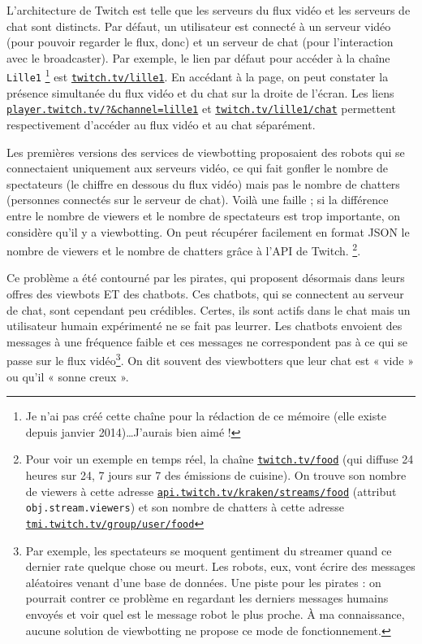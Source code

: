 \documentclass[a4paper]{article}
\begin{document}
L'architecture de Twitch est telle que les serveurs du flux vidéo et les serveurs de chat sont distincts. Par défaut, un utilisateur est connecté à un serveur vidéo (pour pouvoir regarder le flux, donc) et un serveur de chat (pour l'interaction avec le broadcaster). Par exemple, le lien par défaut pour accéder à la chaîne \texttt{Lille1} \footnote{Je n'ai pas créé cette chaîne pour la rédaction de ce mémoire (elle existe depuis janvier 2014)\ldots J'aurais bien aimé !} est \href{https://www.twitch.tv/lille1}{\texttt{twitch.tv/lille1}}. En accédant à la page, on peut constater la présence simultanée du flux vidéo et du chat sur la droite de l'écran. Les liens \href{https://player.twitch.tv/?\&channel=lille1}{\texttt{player.twitch.tv/?\&channel=lille1}} et \href{https://www.twitch.tv/lille1/chat}{\texttt{twitch.tv/lille1/chat}} permettent respectivement d'accéder au flux vidéo et au chat séparément.

Les premières versions des services de viewbotting proposaient des robots qui se connectaient uniquement aux serveurs vidéo, ce qui fait gonfler le nombre de spectateurs (le chiffre en dessous du flux vidéo) mais pas le nombre de chatters (personnes connectés sur le serveur de chat). Voilà une faille ; si la différence entre le nombre de viewers et le nombre de spectateurs est trop importante, on considère qu'il y a viewbotting. On peut récupérer facilement en format JSON le nombre de viewers et le nombre de chatters grâce à l'API de Twitch. \footnote{Pour voir un exemple en temps réel, la chaîne \href{https://www.twitch.tv/food}{\texttt{twitch.tv/food}} (qui diffuse 24 heures sur 24, 7 jours sur 7 des émissions de cuisine). On trouve son nombre de viewers à cette adresse \href{https://api.twitch.tv/kraken/streams/food}{\texttt{api.twitch.tv/kraken/streams/food}} (attribut \texttt{obj.stream.viewers}) et son nombre de chatters à cette adresse \href{http://tmi.twitch.tv/group/user/food}{\texttt{tmi.twitch.tv/group/user/food}}}.

Ce problème a été contourné par les pirates, qui proposent désormais dans leurs offres des viewbots ET des chatbots. Ces chatbots, qui se connectent au serveur de chat, sont cependant peu crédibles. Certes, ils sont actifs dans le chat mais un utilisateur humain expérimenté ne se fait pas leurrer. Les chatbots envoient des messages à une fréquence faible et ces messages ne correspondent pas à ce qui se passe sur le flux vidéo\footnote{Par exemple, les spectateurs se moquent gentiment du streamer quand ce dernier rate quelque chose ou meurt. Les robots, eux, vont écrire des messages aléatoires venant d'une base de données. Une piste pour les pirates : on pourrait contrer ce problème en regardant les derniers messages humains envoyés et voir quel est le message robot le plus proche. À ma connaissance, aucune solution de viewbotting ne propose ce mode de fonctionnement.}. On dit souvent des viewbotters que leur chat est « vide » ou qu'il « sonne creux ».
\end{document}
